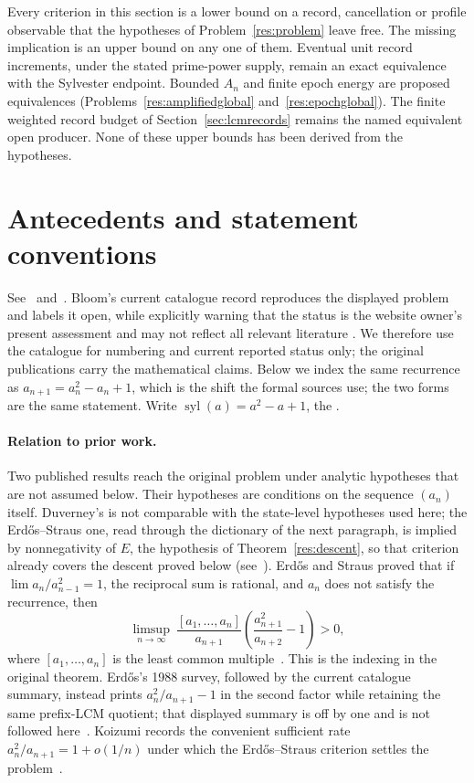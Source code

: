 \documentclass[11pt]{article}
\newcommand{\sylnext}{\operatorname{syl}}
\begin{document}
Every criterion in this section is a lower bound on a record, cancellation or
profile observable that the hypotheses of Problem~\ref{res:problem} leave free.
The missing implication is an upper bound on any one of them.  Eventual unit
record increments, under the stated prime-power supply, remain an exact
equivalence with the Sylvester endpoint.  Bounded $A_n$ and finite epoch energy
are proposed equivalences (Problems~\ref{res:amplifiedglobal}
and~\ref{res:epochglobal}).  The finite weighted record budget of
Section~\ref{sec:lcmrecords} remains the named equivalent open producer.  None
of these upper bounds has been derived from the hypotheses.



\section{Antecedents and statement conventions}\label{app:antecedents}

\noindent See~\cite[p.~64]{erdosgraham1980} and~\cite[p.~105]{erdos1988}.
Bloom's current catalogue record reproduces the displayed problem and labels
it open, while explicitly warning that the status is the website owner's
present assessment and may not reflect all relevant literature
\cite{erdosproblems}.  We therefore use the catalogue for numbering and
current reported status only; the original publications carry the
mathematical claims.  Below we index the same recurrence as
$a_{n+1}=a_n^{2}-a_n+1$, which is the shift the formal sources use; the two
forms are the same statement.  Write $\sylnext(a)=a^{2}-a+1$, the
.

\paragraph{Relation to prior work.}
Two published results reach the original problem under analytic hypotheses that
are not assumed below.  Their hypotheses are conditions on the sequence $(a_n)$
itself.  Duverney's is not comparable with the state-level hypotheses used
here; the Erd\H{o}s--Straus one, read through the dictionary of the next
paragraph, is implied by nonnegativity of $E$, the hypothesis of
Theorem~\ref{res:descent}, so that criterion already covers the descent proved
below (see~\cite[Cor.~4(1) and Prop.~1(1), pp.~14--15]{koizumi2025}).
Erd\H{o}s and Straus proved that if $\lim a_n/a_{n-1}^{2}=1$, the reciprocal
sum is rational, and $a_n$ does not satisfy the recurrence, then
\[
 \limsup_{n\to\infty}\ \frac{[a_1,\ldots,a_n]}{a_{n+1}}
 \left(\frac{a_{n+1}^{2}}{a_{n+2}}-1\right)>0,
\]
where $[a_1,\ldots,a_n]$ is the least common
multiple~\cite[Theorem~3, p.~132]{erdosstraus1964}.  This is the indexing in
the original theorem.  Erd\H{o}s's 1988 survey, followed by the current
catalogue summary, instead prints $a_n^2/a_{n+1}-1$ in the second factor while
retaining the same prefix-LCM quotient; that displayed summary is off by one
and is not followed here~\cite[p.~105]{erdos1988}\cite{erdosproblems}.
Koizumi records the convenient sufficient rate
$a_n^2/a_{n+1}=1+o(1/n)$ under which the Erd\H{o}s--Straus criterion settles
the problem~\cite[Remark~3, p.~16]{koizumi2025}.
\end{document}

